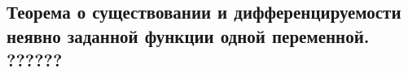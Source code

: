 {
\subsection{Теорема о существовании и дифференцируемости неявно заданной функции одной переменной.  ??????}
}
